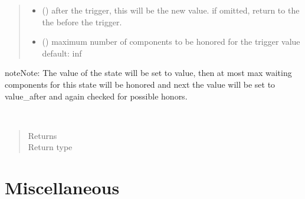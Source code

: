 \documentclass[letterpaper,10pt,english]{sphinxmanual}
\begin{document}
\begin{fulllineitems}
\begin{fulllineitems}
\begin{quote}
\begin{description}
\begin{itemize}
\item {} 
 (\sphinxstyleliteralemphasis{ (}\sphinxstyleliteralemphasis{)}) \textendash{} after the trigger, this will be the new value. 
if omitted, return to the the before the trigger.

\item {} 
 () \textendash{} maximum number of components to be honored for the trigger value 
default: inf

\end{itemize}

\end{description}\end{quote}

\begin{sphinxadmonition}{note}{Note:}
The value of the state will be set to value, then at most
max waiting components for this state  will be honored and next
the value will be set to value\_after and again checked for possible
honors.
\end{sphinxadmonition}

\end{fulllineitems}


\begin{fulllineitems}
\label{\detokenize{Reference:salabim.State.waiters}}~\begin{quote}\begin{description}
\item[{Returns}] \leavevmode
{}

\item[{Return type}] \leavevmode
{\hyperref[\detokenize{Reference:salabim.Queue}]{}}

\end{description}\end{quote}

\end{fulllineitems}


\end{fulllineitems}



\section{Miscellaneous}
\label{\detokenize{Reference:miscellaneous}}
\end{document}
